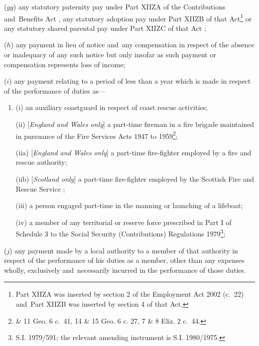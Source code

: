 \documentclass[12pt,a4paper]{article}
\begin{document}
\begin{enumerate}
($gg$) any statutory paternity pay under Part XIIZA of the Contributions and~Benefits Act%
,  %
any statutory adoption pay under Part XIIZB of that Act\footnote{Part XIIZA was inserted by section 2 of the Employment Act 2002 (c.\ 22) and~Part XIIZB was inserted by section 4 of that Act.}
or any statutory shared parental pay under Part XIIZC of that Act%
;

($h$) any payment in lieu of notice and~any compensation in respect of the absence or inadequacy of any such notice but only insofar as such payment or compensation represents loss of income;

($i$) any payment relating to a period of less than a year which is made in respect of the performance of duties as—
\begin{enumerate}\item[]
(i) an auxiliary coastguard in respect of coast rescue activities;

(ii) [\emph{England and Wales only}] a part-time fireman in a fire brigade maintained in pursuance of the Fire Services Acts 1947 to 1959\footnote{ \& 11 Geo. 6 c.~41, 14 \& 15 Geo. 6 c. 27, 7 \& 8 Eliz. 2 c.~44.};

(iia) [\emph{England and Wales only}] a part-time fire-fighter employed by a fire and rescue authority;

(iib) [\emph{Scotland only}] a part-time fire-fighter employed by 
the Scottish Fire and Rescue Service%
;

(iii) a person engaged part-time in the manning or launching of a lifeboat;

(iv) a member of any territorial or reserve force prescribed in Part I of Schedule 3 to the Social Security (Contributions) Regulations 1979\footnote{\frenchspacing S.I. 1979/591; the relevant amending instrument is S.I. 1980/1975.};
\end{enumerate}

($j$) any payment made by a local authority to a member of that authority in respect of the performance of his duties as a member, other than any expenses wholly, exclusively and~necessarily incurred in the performance of those duties.
\end{enumerate}
\end{document}
